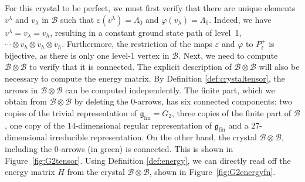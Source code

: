 \documentclass[pdftex]{sigma}
\numberwithin{equation}{section}
\theoremstyle{definition}
\begin{document}
For this crystal to be perfect, we must first verify that there are unique elements $v^\lambda$ and $v_\lambda$ in $\mathcal{B}$ such that $\varepsilon(v^\lambda) = \Lambda_0$ and $\varphi(v_\lambda) = \Lambda_0$. Indeed, we have $v^\lambda = v_\lambda = v_h$, resulting in a constant ground state path of level~1, $\cdots\otimes v_h\otimes v_h\otimes v_h$. Furthermore, the restriction of the maps $\varepsilon$ and $\varphi$ to $P_\ell^+$ is bijective, as there is only one level-1 vertex in $\mathcal{B}$. Next, we need to compute $\mathcal{B} \otimes \mathcal{B}$ to verify that it is connected. The explicit description of $\mathcal{B} \otimes \mathcal{B}$ will also be necessary to compute the energy matrix. By Definition \ref{def:crystaltensor}, the arrows in $\mathcal{B} \otimes \mathcal{B}$ can be computed independently. The finite part, which we obtain from $\mathcal{B} \otimes \mathcal{B}$ by deleting the $0$-arrows, has six connected components: two copies of the trivial representation of $\mathfrak{g}_\mathrm{fin} = G_2$, three copies of the finite part of $\mathcal{B}$, one copy of the $14$-dimensional regular representation of $\mathfrak{g}_\mathrm{fin}$ and a $27$-dimensional irreducible representation. On the other hand, the crystal $\mathcal{B}\otimes\mathcal{B}$, including the 0-arrows (in green) is connected. This is shown in Figure~\ref{fig:G2tensor}. Using Definition \ref{def:energy}, we can directly read off the energy matrix $H$ from the crystal $\mathcal{B} \otimes \mathcal{B}$, shown in Figure~\ref{fig:G2energyfn}.
\end{document}
